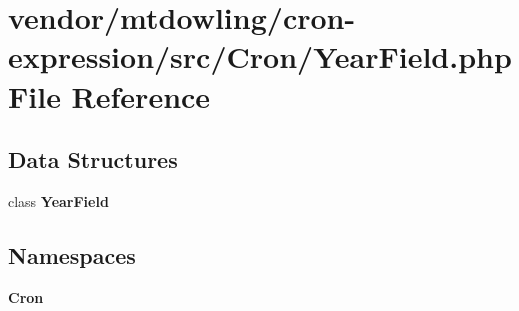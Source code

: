 \section{vendor/mtdowling/cron-\/expression/src/\+Cron/\+Year\+Field.php File Reference}
\label{_year_field_8php}
\subsection*{Data Structures}
\begin{DoxyCompactItemize}
\item 
class {\bf Year\+Field}
\end{DoxyCompactItemize}
\subsection*{Namespaces}
\begin{DoxyCompactItemize}
\item 
 {\bf Cron}
\end{DoxyCompactItemize}
